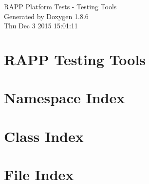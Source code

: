 \documentclass[twoside]{book}
\newcommand{\clearemptydoublepage}{%
  \newpage{\pagestyle{empty}\cleardoublepage}%
}
\begin{document}
\hypersetup{pageanchor=false}
\begin{titlepage}
\vspace*{7cm}
\begin{center}%
{\Large R\-A\-P\-P Platform Tests -\/ Testing Tools }\\
\vspace*{1cm}
{\large Generated by Doxygen 1.8.6}\\
\vspace*{0.5cm}
{\small Thu Dec 3 2015 15:01:11}\\
\end{center}
\end{titlepage}
\clearemptydoublepage
\tableofcontents
\clearemptydoublepage
{}
\hypersetup{pageanchor=true}

\chapter{R\-A\-P\-P Testing Tools}
\label{md__home_travis_rapp_temp_rapp-platform_rapp_testing_tools_README}
\hypertarget{md__home_travis_rapp_temp_rapp-platform_rapp_testing_tools_README}{}

\chapter{Namespace Index}

\chapter{Class Index}

\chapter{File Index}

\end{document}
